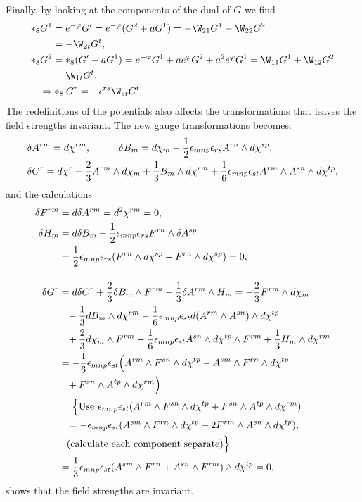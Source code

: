 Finally, by looking at the components of the dual of $G$ we find
\begin{align}
*_8G^1&=e^{-\varphi}G'=e^{-\varphi}(G^2+aG^1)=-\W_{21}G^1-\W_{22}G^2 \nonumber \\
&=-\W_{2t}G^t, \\
*_8G^2&=*_8(G'-aG^1)=e^{-\varphi}G^1+ae^{\varphi}G^2+a^2e^{\varphi}G^1=\W_{11}G^1+\W_{12}G^2 \nonumber \\
&=\W_{1t}G^t, \\
\Rightarrow & *_8G^r=-\epsilon^{rs}\W_{st}G^t.
\end{align}
The redefinitions of the potentials also affects the transformations that leaves the field strengths invariant. 
The new gauge transformations becomes:
\begin{align}
&\delta A^{rm}=d\chi^{rm}, \hspace{1cm} \delta B_m =d\chi_m -{1 \over 2}\epsilon_{mnp}\epsilon_{rs}A^{rn} \wedge d\chi^{sp}, \nonumber \\
&\delta C^r = d\chi^r -{2 \over 3}A^{rm} \wedge d\chi_m +{1 \over 3}B_m \wedge d\chi^{rm} + {1 \over 6}\epsilon_{mnp}\epsilon_{st}A^{rm} \wedge A^{sn} \wedge d\chi^{tp},
\end{align}
and the calculations
\begin{align}
\delta F^{rm}&=d \delta A^{rm} = d^2 \chi^{rm}=0, \\
\delta H_m&=d\delta B_m - {1 \over 2}\epsilon_{mnp}\epsilon_{rs}F^{rn} \wedge \delta A^{sp} \nonumber \\
&={1 \over 2}\epsilon_{mnp}\epsilon_{rs}(F^{rn}\wedge d\chi^{sp}-F^{rn}\wedge d\chi^{sp})=0, \\
\intertext{}
\delta G^r&=d \delta C^r + {2 \over 3} \delta B_m \wedge F^{rm} - {1 \over 3}\delta A^{rm} \wedge H_m =-{2 \over 3}F^{rm} \wedge d\chi_m \nonumber \\
&\phantom{=}-{1 \over 3}dB_m \wedge d\chi^{rm}-{1 \over 6}\epsilon_{mnp}\epsilon_{st}d(A^{rm} \wedge A^{sn}) \wedge d\chi^{tp} \nonumber \\
&\phantom{=}+{2 \over 3} d\chi_m \wedge F^{rm}-{1 \over 6}\epsilon_{mnp}\epsilon_{st}A^{sn} \wedge d\chi^{tp} \wedge F^{rm} +{1 \over 3}H_m \wedge d\chi^{rm} \nonumber \\
&=-{1 \over 6}\epsilon_{mnp}\epsilon_{st}\Big{(}A^{rm} \wedge F^{sn} \wedge d\chi^{tp} - A^{sm} \wedge F^{rn} \wedge d\chi^{tp} \nonumber \\
&\phantom{=}+ F^{sn} \wedge A^{tp} \wedge d\chi^{rm}\Big{)} \nonumber \\
&= \Big{\{} \mbox{Use } \epsilon_{mnp}\epsilon_{st}(A^{rm} \wedge F^{sn} \wedge d\chi^{tp} + F^{sn} \wedge A^{tp} \wedge d\chi^{rm}) \nonumber \\
&\phantom{=}= -\epsilon_{mnp}\epsilon_{st}(A^{sm} \wedge F^{rn} \wedge d\chi^{tp} + 2F^{rm} \wedge A^{sn} \wedge d\chi^{tp}), \nonumber \\
&\phantom{=}\mbox{(calculate each component separate)}\Big{\}} \nonumber \\
&={1 \over 3}\epsilon_{mnp}\epsilon_{st}(A^{sm} \wedge F^{rn} + A^{sn} \wedge F^{rm})\wedge d\chi^{tp}=0,
\end{align}
shows that the field strengths are invariant.






